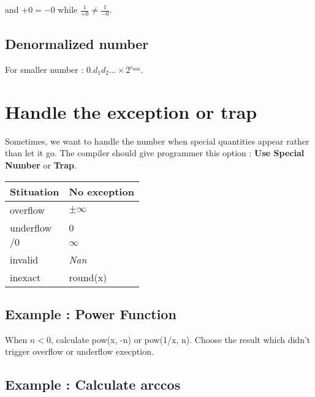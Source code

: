 and $+0 = -0$ while $\frac{1}{+0} \neq \frac{1}{-0}$.

\subsection{Denormalized number}

For smaller number : $0.d_1d_2 \dots \times 2^{e_{\min}}$.

\section{Handle the exception or trap}

Sometimes, we want to handle the number when special quantities appear rather than let it go.
The compiler should give programmer this option :
\textbf{Use Special Number} or \textbf{Trap}.

\begin{center}
    \begin{tabular}{ | l | l |}
        \hline
        Stituation & No exception  \\ \hline
        overflow   & $\pm \infty$  \\ \hline
        underflow  & 0             \\ \hline
        $/0$       & $\infty$      \\ \hline
        invalid    & {\it Nan}     \\ \hline 
        inexact    & round(x)      \\ \hline
    \end{tabular}
\end{center}

\subsection{Example : Power Function}
When $n < 0$, calculate pow(x, -n) or pow(1/x, n).
Choose the result which didn't trigger overflow or underflow execption.

\subsection{Example : Calculate arccos}


